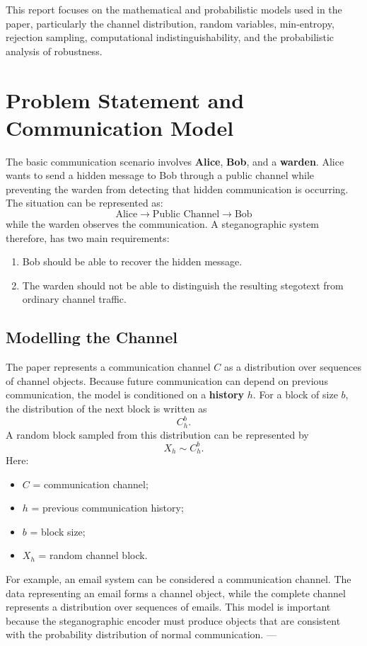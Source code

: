 \documentclass[14pt]{article}
\begin{document}
This report focuses on the mathematical and probabilistic models used in the paper, particularly the channel distribution, random variables, min-entropy, rejection sampling, computational indistinguishability, and the probabilistic analysis of robustness.

\section{Problem Statement and Communication Model}
The basic communication scenario involves \textbf{Alice}, \textbf{Bob}, and a \textbf{warden}. Alice wants to send a hidden message to Bob through a public channel while preventing the warden from detecting that hidden communication is occurring.
The situation can be represented as:
\[\text{Alice}
\rightarrow \text{Public Channel} \rightarrow \text{Bob}\]
while the warden observes the communication.
A steganographic system therefore, has two main requirements:
\begin{enumerate}
\item Bob should be able to recover the hidden message.
\item The warden should not be able to distinguish the resulting stegotext from ordinary channel traffic.
\end{enumerate}
\subsection{Modelling the Channel}
The paper represents a communication channel \(C\) as a distribution over sequences of channel objects. Because future communication can depend on previous communication, the model is conditioned on a \textbf{history} \(h\).
For a block of size \(b\), the distribution of the next block is written as
\[
C_h^b.
\]
A random block sampled from this distribution can be represented by
\[
X_h\sim C_h^b.
\]
Here:
\begin{itemize}
\item \(C\) = communication channel;
\item \(h\) = previous communication history;
\item \(b\) = block size;
\item \(X_h\) = random channel block.
\end{itemize}
For example, an email system can be considered a communication channel. The data representing an email forms a channel object, while the complete channel represents a distribution over sequences of emails.
This model is important because the steganographic encoder must produce objects that are consistent with the probability distribution of normal communication.
---
\end{document}
